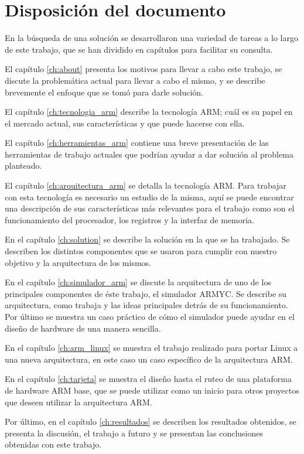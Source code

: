 \section{Disposici\'on del documento}

En la búsqueda de una solución se desarrollaron una variedad de tareas a lo largo de este trabajo, que se han dividido en capítulos para facilitar su consulta.

El capítulo \ref{ch:about} presenta los motivos para llevar a cabo este trabajo, se discute la problemática actual para llevar a cabo el mismo, y se describe brevemente el enfoque que se tomó para darle solución.

El capítulo \ref{ch:tecnologia_arm} describe la tecnología ARM; cuál es su papel en el mercado actual, sus características y que puede hacerse con ella.

El capítulo \ref{ch:herramientas_arm} contiene una breve presentación de las herramientas de trabajo actuales que podrían ayudar a dar solución al problema planteado.

El capítulo \ref{ch:arquitectura_arm} se detalla la tecnología ARM. Para trabajar con esta tecnología es necesario un estudio de la misma, aquí se puede encontrar una descripción de sus características más relevantes para el trabajo como son el funcionamiento del procesador, los registros y la interfaz de memoria.

En el capítulo \ref{ch:solution} se describe la solución en la que se ha trabajado. Se describen los distintos componentes que se usaron para cumplir con nuestro objetivo y la arquitectura de los mismos.

En el capítulo \ref{ch:simulador_arm} se discute la arquitectura de uno de los principales componentes de éste trabajo, el simulador ARMYC. Se describe su arquitectura, como trabaja y las ideas principales detrás de su funcionamiento. Por último se muestra un caso práctico de cómo el simulador puede ayudar en el diseño de hardware de una manera sencilla.

En el capítulo \ref{ch:arm_linux} se muestra el trabajo realizado para portar Linux a una nueva arquitectura, en este caso un caso específico de la arquitectura ARM.

En el capítulo \ref{ch:tarjeta} se muestra el diseño hasta el ruteo de una plataforma de hardware ARM base, que se puede utilizar como un inicio para otros proyectos que deseen utilizar la arquitectura ARM.

Por último, en el capítulo \ref{ch:resultados} se describen los resultados obtenidos, se presenta la discusión, el trabajo a futuro y se presentan las conclusiones obtenidas con este trabajo.


